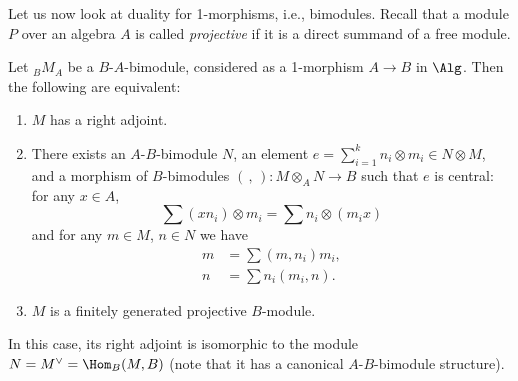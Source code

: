 Let us now look at duality for 1-morphisms, i.e., bimodules.
Recall that a module $P$ over an algebra $A$ is called
\emph{projective}
if it is a direct summand of a free module.

\begin{theorem}\label{t:alg-adjoint}
  Let ${}_BM_A$ be a $B$-$A$-bimodule, considered as a 1-morphism
  $A\to B$ in $\Alg$.
  Then the following are equivalent:
  \begin{enumerate}
    \item $M$ has a right adjoint.
    \item There exists an $A$-$B$-bimodule $N$, an element
      $e=\sum_{i=1}^k n_i\otimes m_i\in N\otimes M$,
      and a morphism of $B$-bimodules $(\, ,\,)\colon M\otimes_A N\to B$
      such that $e$ is central: for any $x\in A$,
      $$
        \sum (xn_i)\otimes m_i=\sum n_i\otimes (m_i x)
      $$
      and for any $m\in M$, $n\in N$ we have
      \begin{equation}\label{e:alg-adjoint-snake}
        \begin{aligned}
          m&=\sum (m, n_i) m_i,\\
          n&=\sum n_i (m_i, n).
        \end{aligned}
      \end{equation}
    \item $M$ is a finitely generated projective $B$-module.
  \end{enumerate}
  In this case, its right adjoint is isomorphic to the module
  $N=M^\vee = \Hom_B (M, B)$ \textup{(}note that it has a
  canonical $A$-$B$-bimodule structure\textup{)}.
\end{theorem}
